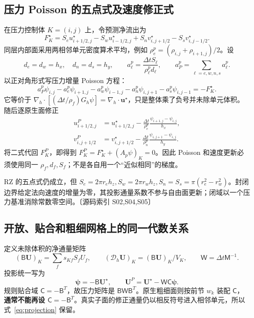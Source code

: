 \documentclass[UTF8,a4paper,11pt,fontset=fandol]{ctexart}
\newcommand{\src}[1]{\textcolor{ink}{\small〔源码索引 #1〕}}
\newcommand{\UU}{\bm{U}}
\newcommand{\vel}{\bm{u}}
\newcommand{\dt}{\Delta t}
\newcommand{\mat}[1]{\mathsf{#1}}
\begin{document}
\subsection{压力 Poisson 的五点式及速度修正式}
在压力控制体 $K=(i,j)$ 上，令预测净流出为
\begin{equation}
 F_K^\star=S_eu_{i+1/2,j}^\star-S_wu_{i-1/2,j}^\star
               +S_nv_{i,j+1/2}^\star-S_sv_{i,j-1/2}^\star.
\end{equation}
同层内部面采用两相邻单元密度算术平均，例如 $\rho_e^p=(\rho_{i,j}+\rho_{i+1,j})/2$。设
\begin{equation}
 d_e=d_w=h_x,\quad d_n=d_s=h_y,\qquad
 a_\ell^p=\frac{\dt S_\ell}{\rho_\ell^p d_\ell},\qquad
 a_P^p=\sum_{\ell=e,w,n,s}a_\ell^p.
\end{equation}
以正对角形式写压力增量 Poisson 方程：
\begin{equation}
 a_P^p\psi_{i,j}-a_e^p\psi_{i+1,j}-a_w^p\psi_{i-1,j}
 -a_n^p\psi_{i,j+1}-a_s^p\psi_{i,j-1}=-F_K^\star.\label{eq:poisson5}
\end{equation}
它等价于 $\nabla_h\cdot[(\dt/\rho_f)G_h\psi]=\nabla_h\cdot\vel^\star$，只是整体乘了负号并未除单元体积。随后逐原生面修正
\begin{align}
 u_{i+1/2,j}^{P}&=u_{i+1/2,j}^\star
          -\frac{\dt}{\rho_e^p}\frac{\psi_{i+1,j}-\psi_{i,j}}{h_x},\\
 v_{i,j+1/2}^{P}&=v_{i,j+1/2}^\star
          -\frac{\dt}{\rho_n^p}\frac{\psi_{i,j+1}-\psi_{i,j}}{h_y}.
\end{align}
将二式代回 $F_K^P$，即得到 $F_K^P=F_K^\star+(A_p\psi)_K=0$。因此 Poisson 和速度更新必须使用同一 $\rho_f,d_f,S_f$；不是各自用一个“近似相同”的梯度。

RZ 的五点式仍成立，但 $S_e=2\pi r_eh_z,S_w=2\pi r_wh_z,S_n=S_s=\pi(r_e^2-r_w^2)$。封闭边界给定法向速度的增量为零，其投影通量系数不参与自由面更新；闭域以一个压力基准消除常数零空间。\src{S02,S04,S05}

\subsection{开放、贴合和粗细网格上的同一代数关系}
定义未除体积的净通量矩阵
\begin{equation}
 (\mat B\UU)_K=\sum_fs_{Kf}S_fU_f,\qquad
 (\mathcal D_h\UU)_K=(\mat B\UU)_K/V_K,
 \qquad\mat W=\dt\mat M^{-1}.
\end{equation}
投影统一写为
\begin{equation}
 [-\mat B\mat W\mat C]\bm\psi=-\mat B\UU^\star,
 \qquad\UU^P=\UU^\star-\mat W\mat C\bm\psi.\label{eq:projection}
\end{equation}
规则贴合域 $\mat C=-\mat B^T$，故压力矩阵是 $\mat B\mat W\mat B^T$。原生粗细面则按前节 $w_k$ 装配 $\mat C$，\textbf{通常不能再设 $\mat C=-\mat B^T$}。真实子面的修正通量仍以相反符号进入相邻单元，所以式~\eqref{eq:projection} 保留。
\end{document}
